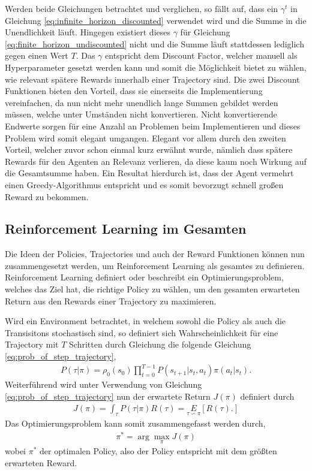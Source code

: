 \documentclass[]{iat}
\begin{document}
Werden beide Gleichungen betrachtet und verglichen, so fällt auf, dass ein $\gamma^t$ in Gleichung \ref{eq:infinite_horizon_discounted} verwendet wird und die Summe in die Unendlichkeit läuft. Hingegen existiert dieses $\gamma$ für Gleichung \ref{eq:finite_horizon_undiscounted} nicht und die Summe läuft stattdessen lediglich gegen einen Wert $T$. Das $\gamma$ entspricht dem Discount Factor, welcher manuell als Hyperparameter gesetzt werden kann und somit die Möglichkeit bietet zu wählen, wie relevant spätere Rewards innerhalb einer Trajectory sind. Die zwei Discount Funktionen bieten den Vorteil, dass sie einerseits die Implementierung vereinfachen, da nun nicht mehr unendlich lange Summen gebildet werden müssen, welche unter Umständen nicht konvertieren. Nicht konvertierende Endwerte sorgen für eine Anzahl an Problemen beim Implementieren und dieses Problem wird somit elegant umgangen. Elegant vor allem durch den zweiten Vorteil, welcher zuvor schon einmal kurz erwähnt wurde, nämlich dass spätere Rewards für den Agenten an Relevanz verlieren, da diese kaum noch Wirkung auf die Gesamtsumme haben. Ein Resultat hierdurch ist, dass der Agent vermehrt einen Greedy-Algorithmus entspricht und es somit bevorzugt schnell großen Reward zu bekommen. \cite[]{SpinningUp2018} \cite[]{Sutton1998}

\subsection{Reinforcement Learning im Gesamten}
Die Ideen der Policies, Trajectories und auch der Reward Funktionen können nun zusammengesetzt werden, um Reinforcement Learning als gesamtes zu definieren. Reinforcement Learning definiert oder beschreibt ein Optimierungsproblem, welches das Ziel hat, die richtige Policy zu wählen, um den gesamten erwarteten Return aus den Rewards einer Trajectory zu maximieren.

Wird ein Environment betrachtet, in welchem sowohl die Policy als auch die Transisitons stochastisch sind, so definiert sich Wahrscheinlichkeit für eine Trajectory mit $T$ Schritten durch Gleichung die folgende Gleichung \ref{eq:prob_of_step_trajectory},
\begin{align}
    P(\tau | \pi) = \rho_0(s_0) \prod _{t = 0}^{T-1} P\left(s_{t+1}|s_t,a_t\right)\pi(a_t|s_t). \label{eq:prob_of_step_trajectory}
\end{align}
Weiterführend wird unter Verwendung von Gleichung \ref{eq:prob_of_step_trajectory} nun der erwartete Return $J(\pi)$ definiert durch
\begin{align}
    J(\pi) = \int_{\tau}^{} P(\tau | \pi) R(\tau) = \underset{\tau \backsim \pi}{E}\left[R(\tau).\right] \label{eq:expected_return}
\end{align}
Das Optimierungsproblem kann somit zusammengefasst werden durch,
\begin{align}
    \pi^* = \arg \underset{\pi}{\max} J(\pi) \label{eq:optimized_problem}
\end{align}
wobei $\pi^*$ der optimalen Policy, also der Policy entspricht mit dem größten erwarteten Reward. \cite[]{SpinningUp2018} \cite[]{Sutton1998}
\end{document}
